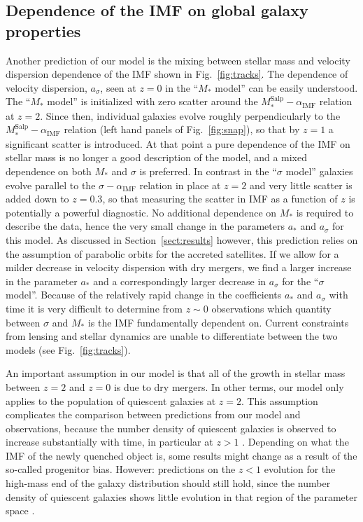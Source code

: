 \documentclass[usenatbib]{mnras}
\def\msalp{M_*^{\mathrm{Salp}}}
\def\aimf{\alpha_{\mathrm{IMF}}}
\def\Sref#1{Section~\ref{#1}\xspace}
\def\Fref#1{Fig.~\ref{#1}\xspace}
\begin{document}
\subsection{Dependence of the IMF on global galaxy properties}

Another prediction of our model is the mixing between stellar mass and
velocity dispersion dependence of the IMF shown in \Fref{fig:tracks}.
The dependence of velocity dispersion, $a_\sigma$, seen at $z=0$ in
the ``$M_*$ model'' can be easily understood.  The ``$M_*$ model'' is
initialized with zero scatter around the $\msalp-\aimf$ relation at
$z=2$.  Since then, individual galaxies evolve roughly perpendicularly
to the $\msalp-\aimf$ relation (left hand panels of \Fref{fig:snap}),
so that by $z=1$ a significant scatter is introduced. At that point a
pure dependence of the IMF on stellar mass is no longer a good
description of the model, and a mixed dependence on both $M_*$ and
$\sigma$ is preferred.  In contrast in the ``$\sigma$ model'' galaxies
evolve parallel to the $\sigma-\aimf$ relation in place at $z=2$ and
very little scatter is added down to $z=0.3$, so that measuring the
scatter in IMF as a function of $z$ is potentially a powerful
diagnostic. No additional dependence on $M_*$ is required to describe
the data, hence the very small change in the parameters $a_*$ and
$a_\sigma$ for this model.  As discussed in \Sref{sect:results}
  however, this prediction relies on the assumption of parabolic
  orbits for the accreted satellites. If we allow for a milder
  decrease in velocity dispersion with dry mergers, we find a larger
  increase in the parameter $a_*$ and a correspondingly larger
  decrease in $a_\sigma$ for the ``$\sigma$ model''. Because of the
relatively rapid change in the coefficients $a_*$ and $a_\sigma$ with
time it is very difficult to determine from $z\sim0$ observations
which quantity between $\sigma$ and $M_*$ is the IMF fundamentally
dependent on. Current constraints from lensing and stellar dynamics
are unable to differentiate between the two models (see
\Fref{fig:tracks}).

An important assumption in our model is that all of the growth in
stellar mass between $z=2$ and $z=0$ is due to dry mergers. In other
terms, our model only applies to the population of quiescent galaxies
at $z=2$. This assumption complicates the comparison between
predictions from our model and observations, because the number
density of quiescent galaxies is observed to increase substantially
with time, in particular at $z>1$ \citep[e.g.][]{Ilb++13,
  Cas++13}. Depending on what the IMF of the newly quenched object is,
some results might change as a result of the so-called progenitor
bias. However: predictions on the $z<1$ evolution for the high-mass
end of the galaxy distribution should still hold, since the number
density of quiescent galaxies shows little evolution in that region of
the parameter space \citep{Lop++12}.
\end{document}
